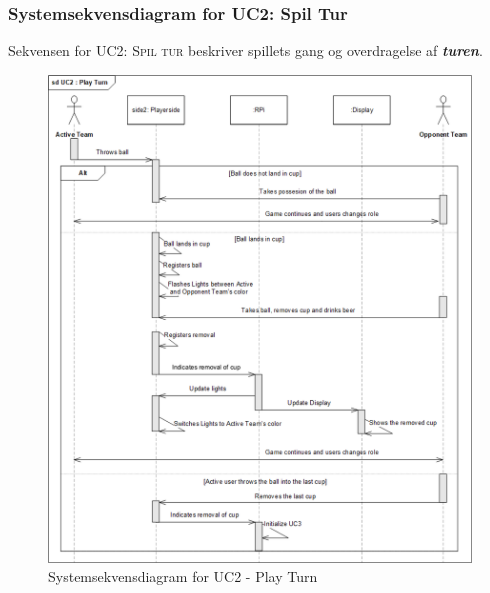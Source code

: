 \documentclass[Rapport/Rapport_main.tex]{subfiles}
\begin{document}
\subsubsection{Systemsekvensdiagram for UC2: Spil Tur}
Sekvensen for \textsc{UC2: Spil tur} beskriver spillets gang og overdragelse af \textit{\textbf{turen}}.
\begin{figure}[H]
    \centering 
    \includegraphics[width=\textwidth]{Arkitektur/Sekvensdiagrammer/graphics/sd_UC2.png}
    \caption{Systemsekvensdiagram for UC2 - Play Turn}
    \label{fig:rap_sd_UC2}
\end{figure}
\end{document}

